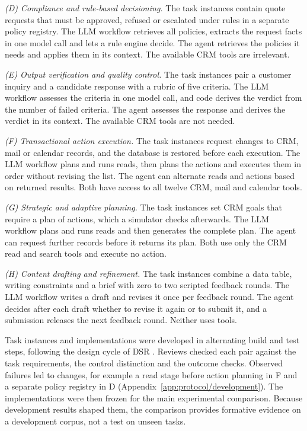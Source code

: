 \emph{(D) Compliance and rule-based decisioning.} The task instances contain quote requests that must be approved, refused or escalated under rules in a separate policy registry. The LLM workflow retrieves all policies, extracts the request facts in one model call and lets a rule engine decide. The agent retrieves the policies it needs and applies them in its context. The available CRM tools are irrelevant.

\emph{(E) Output verification and quality control.} The task instances pair a customer inquiry and a candidate response with a rubric of five criteria. The LLM workflow assesses the criteria in one model call, and code derives the verdict from the number of failed criteria. The agent assesses the response and derives the verdict in its context. The available CRM tools are not needed.

\emph{(F) Transactional action execution.} The task instances request changes to CRM, mail or calendar records, and the database is restored before each execution. The LLM workflow plans and runs reads, then plans the actions and executes them in order without revising the list. The agent can alternate reads and actions based on returned results. Both have access to all twelve CRM, mail and calendar tools.

\emph{(G) Strategic and adaptive planning.} The task instances set CRM goals that require a plan of actions, which a simulator checks afterwards. The LLM workflow plans and runs reads and then generates the complete plan. The agent can request further records before it returns its plan. Both use only the CRM read and search tools and execute no action.

\emph{(H) Content drafting and refinement.} The task instances combine a data table, writing constraints and a brief with zero to two scripted feedback rounds. The LLM workflow writes a draft and revises it once per feedback round. The agent decides after each draft whether to revise it again or to submit it, and a submission releases the next feedback round. Neither uses tools.

Task instances and implementations were developed in alternating build and test steps, following the design cycle of DSR \parencite[p.~90]{hevnerThreeCycleView2007}. Reviews checked each pair against the task requirements, the control distinction and the outcome checks. Observed failures led to changes, for example a read stage before action planning in F and a separate policy registry in D (Appendix~\ref{app:protocol/development}). The implementations were then frozen for the main experimental comparison. Because development results shaped them, the comparison provides formative evidence on a development corpus, not a test on unseen tasks.


